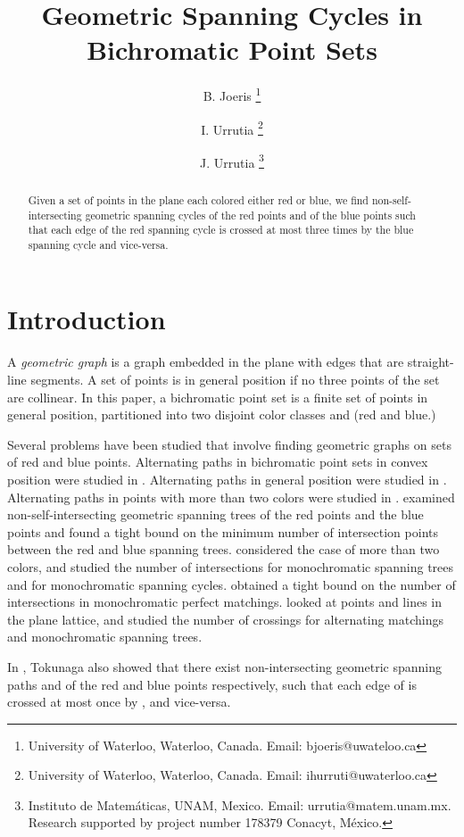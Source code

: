 \documentclass[12pt]{article}
\title{Geometric Spanning Cycles in Bichromatic Point Sets}
\author{B. Joeris \thanks{University of Waterloo, Waterloo, Canada. Email:
bjoeris@uwateloo.ca}
\and I. Urrutia \thanks{University of Waterloo, Waterloo, Canada. Email:
ihurruti@uwaterloo.ca} \and J. Urrutia \thanks{Instituto de Matem{\'a}ticas, UNAM,
Mexico.
Email:
urrutia@matem.unam.mx. Research supported by project number 178379 Conacyt, M{\'e}xico.}}
\date{}
\theoremstyle{definition}
\begin{document}
\maketitle

\begin{abstract}
Given a set of points in the plane each colored either red or blue, we find
non-self-intersecting geometric spanning cycles of the red points and of the
blue points such that each edge of the red spanning cycle is crossed at most
three times by the blue spanning cycle and vice-versa.
\end{abstract}

\section{Introduction}
A \emph{geometric graph} is a graph embedded in the plane
with edges that are straight-line segments. A set of points is in general position if no three points of the set are collinear.
In this paper, a bichromatic point set is a finite set of points  in general position, partitioned into two disjoint color classes  and  (red and blue.) 


Several problems have been studied that involve finding geometric graphs on sets
of red and blue points. 
Alternating paths in bichromatic point sets in convex position were studied in
\cite{akiyama1990simple}. Alternating paths in general position were
studied in \cite{abellanas1999bipartite}.
Alternating paths in points with more
than two colors were studied in \cite{merino2006length}.
\cite{tokunaga1996intersection} examined non-self-intersecting geometric spanning trees of the red points and the blue
points and found a tight bound on the minimum number of intersection points
between the red and blue spanning trees.
\cite{Kano2005301} considered the case of more than two colors, and studied the
 number of intersections for monochromatic spanning trees and for
monochromatic spanning cycles.
\cite{merino2005intersection} obtained a tight bound on the number of
intersections in monochromatic perfect matchings.
\cite{kano2013discrete} looked at points and lines in the plane lattice, and
studied the number of crossings for alternating matchings and monochromatic
spanning trees.



In \cite{tokunaga1996intersection}, Tokunaga also showed that there exist
non-intersecting geometric spanning paths  and  of the red and blue points respectively, such that each
edge of  is crossed at most once by , and vice-versa. 
\end{document}
